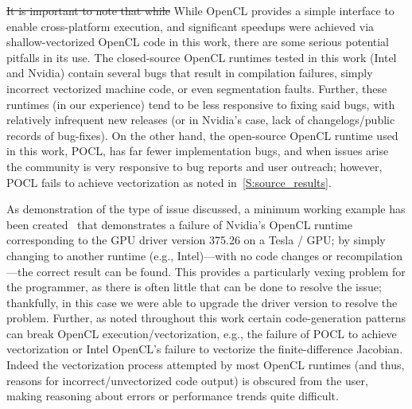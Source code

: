 \documentclass[12pt,number,sort&compress,preprint]{elsarticle}
\newcommand{\revisedelete}[1]{\sloppy\textcolor{RoyalPurple}{\sout{#1}}} %
\begin{document}
\revisedelete{It is important to note that while }While OpenCL provides a simple interface to enable cross-platform execution, and significant speedups were achieved via shallow-vectorized OpenCL code in this work, there are some serious potential pitfalls in its use.
The closed-source OpenCL runtimes tested in this work (Intel and Nvidia) contain several bugs that result in compilation failures, simply incorrect vectorized machine code, or even segmentation faults.
Further, these runtimes (in our experience) tend to be less responsive to fixing said bugs, with relatively infrequent new releases (or in Nvidia's case, lack of changelogs\slash public records of bug-fixes).
On the other hand, the open-source OpenCL runtime used in this work, POCL, has far fewer implementation bugs, and when issues arise the community is very responsive to bug reports and user outreach; however, POCL fails to achieve vectorization as noted in~\cref{S:source_results}.

As demonstration of the type of issue discussed, a minimum working example has been created~\cite{Nvidia_mwe} that demonstrates a failure of Nvidia's OpenCL runtime corresponding to the GPU driver version \num{375.26} on a Tesla \gpunew/ GPU; by simply changing to another runtime (e.g., Intel)---with no code changes or recompilation---the correct result can be found.
This provides a particularly vexing problem for the programmer, as there is often little that can be done to resolve the issue; thankfully, in this case we were able to upgrade the driver version to resolve the problem.
Further, as noted throughout this work certain code-generation patterns can break OpenCL execution\slash vectorization, e.g., the failure of POCL to achieve vectorization or Intel OpenCL's failure to vectorize the finite-difference Jacobian.
Indeed the vectorization process attempted by most OpenCL runtimes (and thus, reasons for incorrect\slash unvectorized code output) is obscured from the user, making reasoning about errors or performance trends quite difficult.
\end{document}
